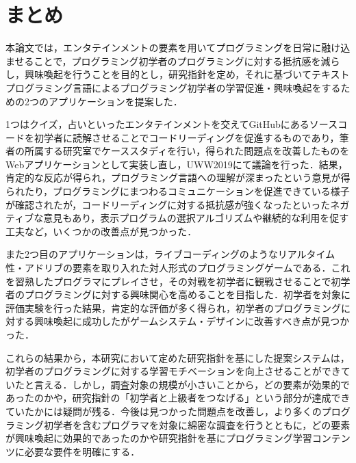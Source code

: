 \section{まとめ}

本論文では，エンタテインメントの要素を用いてプログラミングを日常に融け込ませることで，プログラミング初学者のプログラミングに対する抵抗感を減らし，興味喚起を行うことを目的とし，研究指針を定め，それに基づいてテキストプログラミング言語によるプログラミング初学者の学習促進・興味喚起をするための2つのアプリケーションを提案した．

1つはクイズ，占いといったエンタテインメントを交えてGitHubにあるソースコードを初学者に読解させることでコードリーディングを促進するものであり，筆者の所属する研究室でケーススタディを行い，得られた問題点を改善したものをWebアプリケーションとして実装し直し，UWW2019にて議論を行った．結果，肯定的な反応が得られ，プログラミング言語への理解が深まったという意見が得られたり，プログラミングにまつわるコミュニケーションを促進できている様子が確認されたが，コードリーディングに対する抵抗感が強くなったといったネガティブな意見もあり，表示プログラムの選択アルゴリズムや継続的な利用を促す工夫など，いくつかの改善点が見つかった．

また2つ目のアプリケーションは，ライブコーディングのようなリアルタイム性・アドリブの要素を取り入れた対人形式のプログラミングゲームである．これを習熟したプログラマにプレイさせ，その対戦を初学者に観戦させることで初学者のプログラミングに対する興味関心を高めることを目指した．初学者を対象に評価実験を行った結果，肯定的な評価が多く得られ，初学者のプログラミングに対する興味喚起に成功したがゲームシステム・デザインに改善すべき点が見つかった．


これらの結果から，本研究において定めた研究指針を基にした提案システムは，初学者のプログラミングに対する学習モチベーションを向上させることができていたと言える．しかし，調査対象の規模が小さいことから，どの要素が効果的であったのかや，研究指針の「初学者と上級者をつなげる」という部分が達成できていたかには疑問が残る．今後は見つかった問題点を改善し，より多くのプログラミング初学者を含むプログラマを対象に綿密な調査を行うとともに，どの要素が興味喚起に効果的であったのかや研究指針を基にプログラミング学習コンテンツに必要な要件を明確にする．